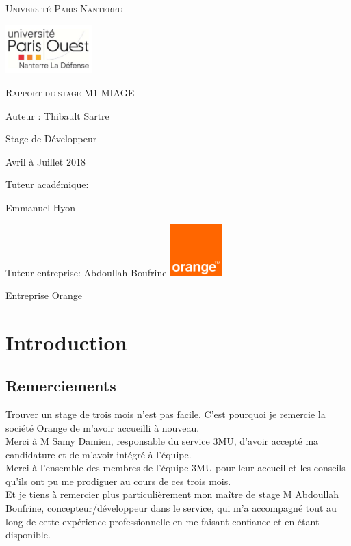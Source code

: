 \documentclass[a4paper,twoside,12pt,openright]{report}
\begin{document}
\begin{titlepage}
	\centering
	\vspace{1cm}
	{\scshape\large Université Paris Nanterre \par}
	\vspace{1cm}
	\includegraphics[width=0.25\textwidth]{univ.JPG}\par
	\vfill
	{\scshape\Huge Rapport de stage M1 MIAGE\par}
	\vspace{1cm}
	{\LARGE Auteur : Thibault Sartre\par}
	\vspace{1cm}
	{\Large Stage de Développeur\par}
	\vspace{1cm}
	{\large Avril à Juillet 2018\par}
	\vspace{1cm}
	\vfill
	{\large Tuteur académique:}
	{\large Emmanuel Hyon\par}
	\vspace{0.5cm}
	{\large Tuteur entreprise:}
	{\large Abdoullah Boufrine}
	\vfill
	\vfill
	\vfill
	\includegraphics[width=0.15\textwidth]{orange.png}\par
	\vspace{1cm}
	{\large Entreprise Orange\par}


\end{titlepage}
\renewcommand{\contentsname}{Sommaire}
\tableofcontents{}
\newpage
\chapter{Introduction}
\section{Remerciements}
Trouver un stage de trois mois n'est pas facile. C'est pourquoi je remercie la société Orange de m'avoir accueilli à nouveau.\\
Merci à M Samy Damien, responsable du service 3MU, d'avoir accepté ma candidature et de m'avoir intégré à l'équipe.\\
Merci à l'ensemble des membres de l'équipe 3MU pour leur accueil et les conseils qu'ils ont pu me prodiguer au cours de ces trois mois.\\
Et je tiens à remercier plus particulièrement mon maître de stage M Abdoullah Boufrine, concepteur/développeur dans le service, qui m'a accompagné tout au long de cette expérience professionnelle en me faisant confiance et en étant disponible.\\
\end{document}
